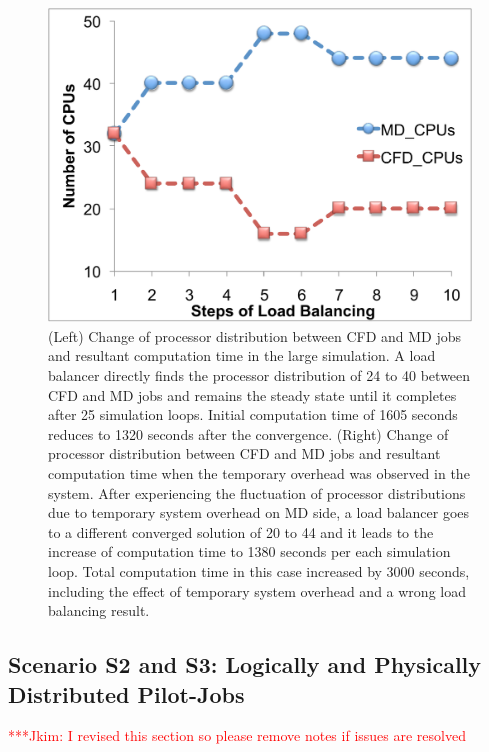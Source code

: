 \documentclass[conference,final]{IEEEtran}
\newcommand{\jhanote}[1]{ {\textcolor{red} { ***Jha: #1 }}}
\newcommand{\Jkimnote}[1]{ {\textcolor{red} { ***Jkim: #1 }}}
\newcommand{\jhanote}[1]{}
\newcommand{\Jkimnote}[1]{}
\begin{document}
\begin{figure}
\includegraphics[scale=0.21]{fig7_22.pdf}
\caption{\small (Left) Change of processor distribution between CFD and MD jobs and resultant computation time in the large simulation. A load balancer directly finds the processor distribution of 24 to 40 between CFD and MD jobs and remains the steady state until it completes after 25 simulation loops. Initial computation time of 1605 seconds reduces to 1320 seconds after the convergence. (Right) Change of processor distribution between CFD and MD jobs and resultant computation time when the temporary overhead was observed in the system. After experiencing the fluctuation of processor distributions due to temporary system overhead on MD side, a load balancer goes to a different converged solution of 20 to 44 and it leads to the increase of computation time to 1380 seconds per each simulation loop. Total computation time in this case increased by 3000 seconds, including the effect of temporary system overhead and a wrong load balancing result.}
\label{Fig:LBLarge}
\end{figure}




\subsection{Scenario S2 and S3: Logically and Physically Distributed
  Pilot-Jobs}


    \Jkimnote{I revised this section so please remove notes if issues are resolved} 
\end{document}
